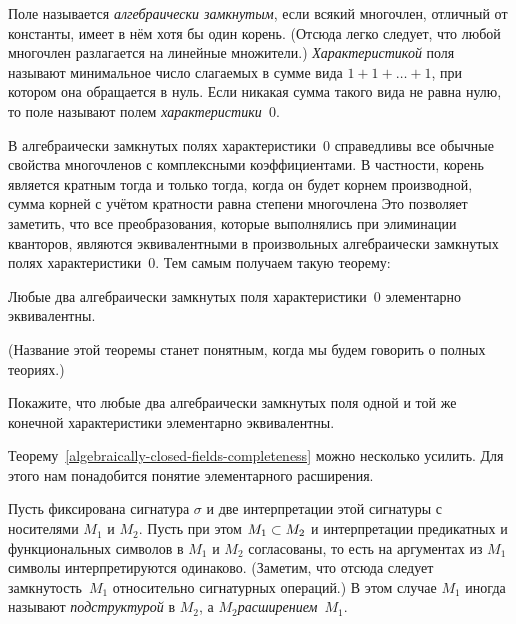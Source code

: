 Поле называется \emph{алгебраически замкнутым},%
%
если всякий
многочлен, отличный от константы, имеет в нём хотя бы один
корень. (Отсюда легко следует, что любой многочлен разлагается
на линейные множители.) \emph{Характеристикой}%
%
поля называют
минимальное число слагаемых в сумме вида $1+1+\ldots+1$, при
котором она обращается в нуль. Если никакая сумма такого вида не
равна нулю, то поле называют полем \emph{характеристики~$0$}.%
%

В алгебраически замкнутых полях характеристики~$0$
справедливы все обычные свойства многочленов с
комплексными коэффициентами. В частности, корень является
кратным тогда и только тогда, когда он будет корнем производной,
сумма корней с учётом кратности равна степени многочлена 
Это позволяет заметить, что все преобразования, которые
выполнялись при элиминации кванторов, являются эквивалентными в
произвольных алгебраически замкнутых полях характеристики~$0$.
Тем самым получаем
такую теорему:

\begin{theorem}
%
        \label{algebraically-closed-fields-completeness}%
Любые два алгебраически замкнутых поля характеристики~$0$
элементарно эк\-ви\-валентны.
\end{theorem}

(Название этой теоремы станет понятным, когда мы будем говорить
о полных теориях.)

\begin{problem}
Покажите, что любые два алгебраически
замкнутых поля одной и той же конечной характеристики
элементарно эквивалентны.
\end{problem}

Теорему~\ref{algebraically-closed-fields-completeness} можно
несколько усилить. Для этого нам понадобится понятие 
элементарного расширения.

Пусть фиксирована сигнатура $\sigma$ и две интерпретации этой
сигнатуры с носителями $M_1$ и $M_2$. Пусть при этом
$M_1\hm\subset M_2$ и интерпретации предикатных и функциональных
символов в $M_1$ и $M_2$ согласованы, то есть на аргументах из
$M_1$ символы интерпретируются одинаково. (Заметим, что отсюда
следует замкнутость~$M_1$ относительно сигнатурных операций.) В
этом случае $M_1$ иногда называют \emph{подструктурой}%
%
в $M_2$,
а $M_2$\т \emph{расширением}~$M_1$.%
%

